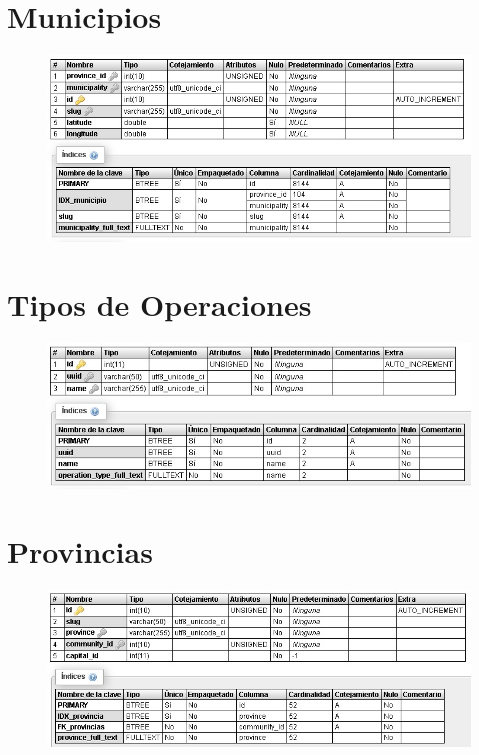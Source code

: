 \pagebreak



\section{Municipios}
\begin{figure}[h]
\centering
\includegraphics[width=1\textwidth]{Img/Disenyo/BD_MUNICIPALITIES.jpg}
\end{figure}

\section{Tipos de Operaciones}
\begin{figure}[h]
\centering
\includegraphics[width=1\textwidth]{Img/Disenyo/BD_OPERATION_TYPES.jpg}
\end{figure}


\pagebreak



\section{Provincias}
\begin{figure}[h]
\centering
\includegraphics[width=1\textwidth]{Img/Disenyo/BD_PROVINCES.jpg}
\end{figure}

